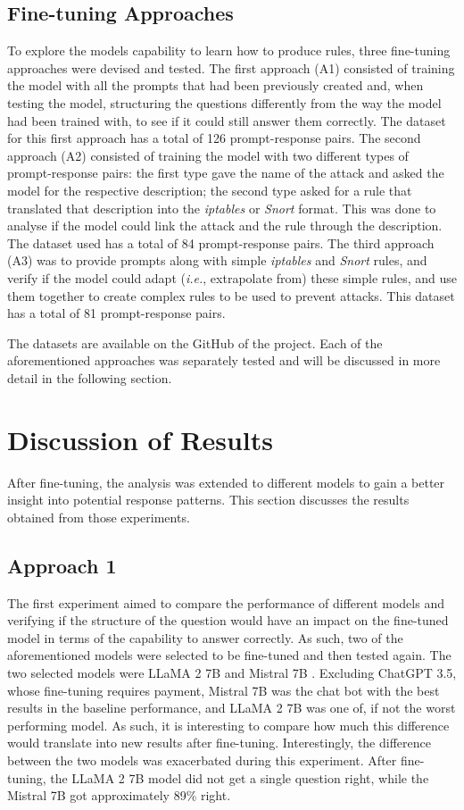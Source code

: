 \documentclass[sigconf]{acmart}
\begin{document}
\subsection{Fine-tuning Approaches}
To explore the models capability to learn how to produce rules, three fine-tuning approaches were devised and tested. The first approach (A1) consisted of training the model with all the prompts that had been previously created and, when testing the model, structuring the questions differently from the way the model had been trained with, to see if it could still answer them correctly. The dataset for this first approach has a total of 126 prompt-response pairs. The second approach (A2) consisted of training the model with two different types of prompt-response pairs: the first type gave the name of the attack and asked the model for the respective description; the second type asked for a rule that translated that description into the \textit{iptables} or \textit{Snort} format. This was done to analyse if the model could link the attack and the rule through the description. The dataset used has a total of 84 prompt-response pairs. The third approach (A3) was to provide prompts along with simple \textit{iptables} and \textit{Snort} rules, and verify if the model could adapt (\textit{i.e.}, extrapolate from) these simple rules, and use them together to create complex rules to be used to prevent attacks. This dataset has a total of 81 prompt-response pairs. 

The datasets are available on the GitHub of the project. Each of the aforementioned approaches was separately tested and will be discussed in more detail in the following section.

\section{Discussion of Results}\label{sec:results}
After fine-tuning, the analysis was extended to different models to gain a better insight into potential response patterns. This section discusses the results obtained from those experiments.

\subsection{Approach 1}
The first experiment aimed to compare the performance of different models and verifying if the structure of the question would have an impact on the fine-tuned model in terms of the capability to answer correctly. As such, two of the aforementioned models were selected to be fine-tuned and then tested again. The two selected models were LLaMA 2 7B \cite{Touvron23} and Mistral 7B \cite{Jiang23}. Excluding ChatGPT 3.5, whose fine-tuning requires payment, Mistral 7B was the chat bot with the best results in the baseline performance, and LLaMA 2 7B was one of, if not the worst performing model. As such, it is interesting to compare how much this difference would translate into new results after fine-tuning. Interestingly, the difference between the two models was exacerbated during this experiment. After fine-tuning, the LLaMA 2 7B model did not get a single question right, while the Mistral 7B got approximately 89\% right. 
\end{document}
